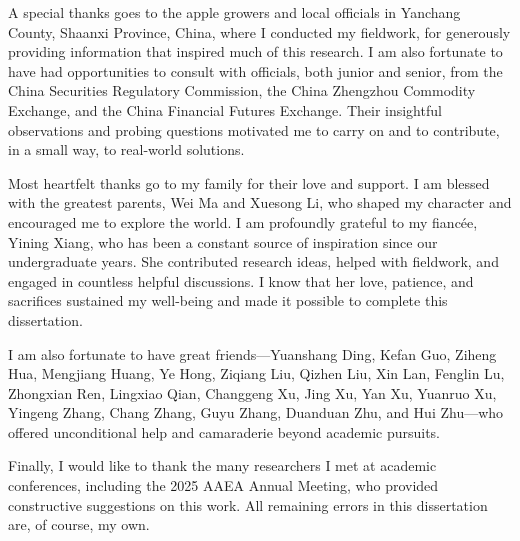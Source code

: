 \documentclass[12pt,authoryear, notitlepage]{elegantpaper}
\begin{document}
\begin{acknowledgments}
A special thanks goes to the apple growers and local officials in Yanchang County, Shaanxi Province, China, where I conducted my fieldwork, for generously providing information that inspired much of this research. I am also fortunate to have had opportunities to consult with officials, both junior and senior, from the China Securities Regulatory Commission, the China Zhengzhou Commodity Exchange, and the China Financial Futures Exchange. Their insightful observations and probing questions motivated me to carry on and to contribute, in a small way, to real-world solutions.

Most heartfelt thanks go to my family for their love and support. I am blessed with the greatest parents, Wei Ma and Xuesong Li, who shaped my character and encouraged me to explore the world. I am profoundly grateful to my fianc\'ee, Yining Xiang, who has been a constant source of inspiration since our undergraduate years. She contributed research ideas, helped with fieldwork, and engaged in countless helpful discussions. I know that her love, patience, and sacrifices sustained my well-being and made it possible to complete this dissertation.

I am also fortunate to have great friends---Yuanshang Ding, Kefan Guo, Ziheng Hua, Mengjiang Huang, Ye Hong, Ziqiang Liu, Qizhen Liu, Xin Lan, Fenglin Lu, Zhongxian Ren, Lingxiao Qian, Changgeng Xu, Jing Xu, Yan Xu, Yuanruo Xu, Yingeng Zhang, Chang Zhang, Guyu Zhang, Duanduan Zhu, and Hui Zhu---who offered unconditional help and camaraderie beyond academic pursuits.

Finally, I would like to thank the many researchers I met at academic conferences, including the 2025 AAEA Annual Meeting, who provided constructive suggestions on this work. All remaining errors in this dissertation are, of course, my own.
\end{acknowledgments}
\end{document}
